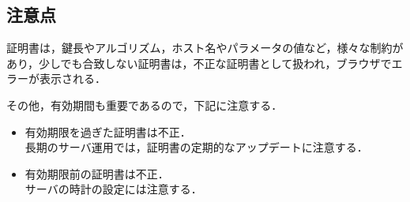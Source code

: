 \subsection{注意点}

証明書は，鍵長やアルゴリズム，ホスト名やパラメータの値など，様々な制約があり，少しでも合致しない証明書は，不正な証明書として扱われ，ブラウザでエラーが表示される．

その他，有効期間も重要であるので，下記に注意する．

\begin{itemize}
    \item 有効期限を過ぎた証明書は不正．\\
    長期のサーバ運用では，証明書の定期的なアップデートに注意する．
    \item 有効期限前の証明書は不正．\\
    サーバの時計の設定には注意する．
\end{itemize}　

